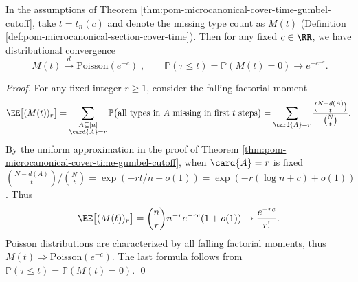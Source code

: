 \begin{theorem}\label{thm:pom-microcanonical-missing-types-poisson}
In the assumptions of Theorem \ref{thm:pom-microcanonical-cover-time-gumbel-cutoff}, take \(t=t_n(c)\) and denote the missing type count as \(M(t)\) (Definition \ref{def:pom-microcanonical-section-cover-time}).
Then for any fixed \(c\in\RR\), we have distributional convergence
\[
\boxed{\;
M(t)\xrightarrow{d}\mathrm{Poisson}(e^{-c})\;},
\qquad
\mathbb{P}(\tau\le t)=\mathbb{P}(M(t)=0)\to e^{-e^{-c}}.
\]
\end{theorem}
\begin{proof}
For any fixed integer \(r\ge 1\), consider the falling factorial moment
\[
\EE\bigl[(M(t))_r\bigr]
=\sum_{\substack{A\subseteq[n]\\ \card{A}=r}}
\mathbb{P}\bigl(\text{all types in \(A\) missing in first \(t\) steps}\bigr)
=\sum_{\card{A}=r}\frac{\binom{N-d(A)}{t}}{\binom{N}{t}}.
\]
By the uniform approximation in the proof of Theorem \ref{thm:pom-microcanonical-cover-time-gumbel-cutoff},
when \(\card{A}=r\) is fixed
\(
\binom{N-d(A)}{t}/\binom{N}{t}
=\exp(-rt/n+o(1))
=\exp(-r(\log n+c)+o(1))
\).
Thus
\[
\EE\bigl[(M(t))_r\bigr]
=\binom{n}{r}n^{-r}e^{-rc}(1+o(1))\to \frac{e^{-rc}}{r!}.
\]
Poisson distributions are characterized by all falling factorial moments, thus \(M(t)\Rightarrow\mathrm{Poisson}(e^{-c})\).
The last formula follows from \(\mathbb{P}(\tau\le t)=\mathbb{P}(M(t)=0)\). \qed
\end{proof}

\endinput

